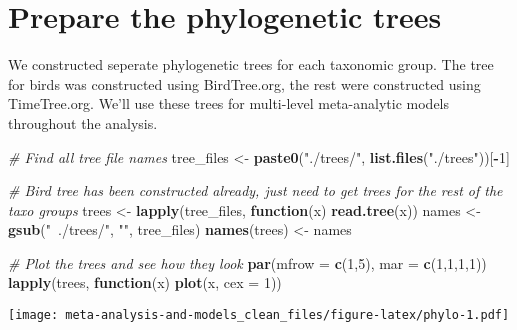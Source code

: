 \documentclass[]{article}
\newenvironment{Shaded}{\begin{snugshade}}{\end{snugshade}}
\newcommand{\KeywordTok}[1]{\textcolor[rgb]{0.13,0.29,0.53}{\textbf{#1}}}
\newcommand{\DataTypeTok}[1]{\textcolor[rgb]{0.13,0.29,0.53}{#1}}
\newcommand{\DecValTok}[1]{\textcolor[rgb]{0.00,0.00,0.81}{#1}}
\newcommand{\StringTok}[1]{\textcolor[rgb]{0.31,0.60,0.02}{#1}}
\newcommand{\CommentTok}[1]{\textcolor[rgb]{0.56,0.35,0.01}{\textit{#1}}}
\newcommand{\ControlFlowTok}[1]{\textcolor[rgb]{0.13,0.29,0.53}{\textbf{#1}}}
\newcommand{\OperatorTok}[1]{\textcolor[rgb]{0.81,0.36,0.00}{\textbf{#1}}}
\newcommand{\NormalTok}[1]{#1}
\begin{document}
\section{Prepare the phylogenetic
trees}\label{prepare-the-phylogenetic-trees}

We constructed seperate phylogenetic trees for each taxonomic group. The
tree for birds was constructed using BirdTree.org, the rest were
constructed using TimeTree.org. We'll use these trees for multi-level
meta-analytic models throughout the analysis.

\begin{Shaded}
\begin{Highlighting}[]
\CommentTok{# Find all tree file names}
\NormalTok{  tree_files <-}\StringTok{ }\KeywordTok{paste0}\NormalTok{(}\StringTok{"./trees/"}\NormalTok{, }\KeywordTok{list.files}\NormalTok{(}\StringTok{"./trees"}\NormalTok{))[}\OperatorTok{-}\DecValTok{1}\NormalTok{]}
  
    \CommentTok{# Bird tree has been constructed already, just need to get trees for the rest of the taxo groups   }
\NormalTok{      trees <-}\StringTok{ }\KeywordTok{lapply}\NormalTok{(tree_files, }\ControlFlowTok{function}\NormalTok{(x) }\KeywordTok{read.tree}\NormalTok{(x))}
\NormalTok{      names <-}\StringTok{ }\KeywordTok{gsub}\NormalTok{(}\StringTok{"~./trees/"}\NormalTok{, }\StringTok{""}\NormalTok{, tree_files)}
      \KeywordTok{names}\NormalTok{(trees) <-}\StringTok{ }\NormalTok{names}

    \CommentTok{# Plot the trees and see how they look}
      \KeywordTok{par}\NormalTok{(}\DataTypeTok{mfrow =} \KeywordTok{c}\NormalTok{(}\DecValTok{1}\NormalTok{,}\DecValTok{5}\NormalTok{), }\DataTypeTok{mar =} \KeywordTok{c}\NormalTok{(}\DecValTok{1}\NormalTok{,}\DecValTok{1}\NormalTok{,}\DecValTok{1}\NormalTok{,}\DecValTok{1}\NormalTok{))}
      \KeywordTok{lapply}\NormalTok{(trees, }\ControlFlowTok{function}\NormalTok{(x) }\KeywordTok{plot}\NormalTok{(x, }\DataTypeTok{cex =} \DecValTok{1}\NormalTok{))}
\end{Highlighting}
\end{Shaded}

\texttt{[image: meta-analysis-and-models\_clean\_files/figure-latex/phylo-1.pdf]}
\end{document}
